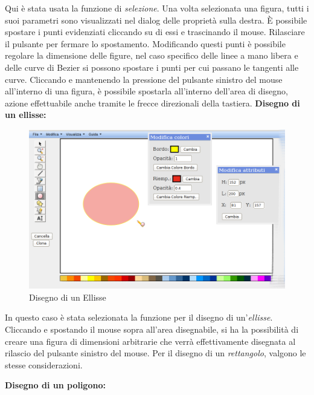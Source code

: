 Qui \`e stata usata la funzione di \textit{selezione}. Una volta selezionata una figura, tutti i suoi parametri sono visualizzati nel dialog delle propriet\` a sulla destra. \`E possibile spostare i punti evidenziati cliccando su di essi e trascinando il mouse. Rilasciare il pulsante per fermare lo spostamento. Modificando questi punti \`e possibile regolare la dimensione delle figure, nel caso specifico delle linee a mano libera e delle curve di Bezier si possono spostare i punti per cui passano le tangenti alle curve. Cliccando e mantenendo la pressione del pulsante sinistro del mouse all'interno di una figura, \`e possibile spostarla all'interno dell'area di disegno, azione effettuabile anche tramite le frecce direzionali della tastiera.
 \newpage
 \textbf{Disegno di un ellisse:}\\
\begin{figure}[!ht]
\centering
\includegraphics[scale=0.5]{images/ellisse.png}
\caption{Disegno di un Ellisse}
\end{figure}
 
\vspace{50pt}
In questo caso \`e stata selezionata la funzione per il disegno di un'\textit{ellisse}. Cliccando e spostando il mouse sopra all'area disegnabile, si ha la possibilit\` a di creare una figura di dimensioni arbitrarie che verr\` a effettivamente disegnata al rilascio del pulsante sinistro del mouse. Per il disegno di un \textit{rettangolo}, valgono le stesse considerazioni.
\newpage


\textbf{Disegno di un poligono:}\\
 
